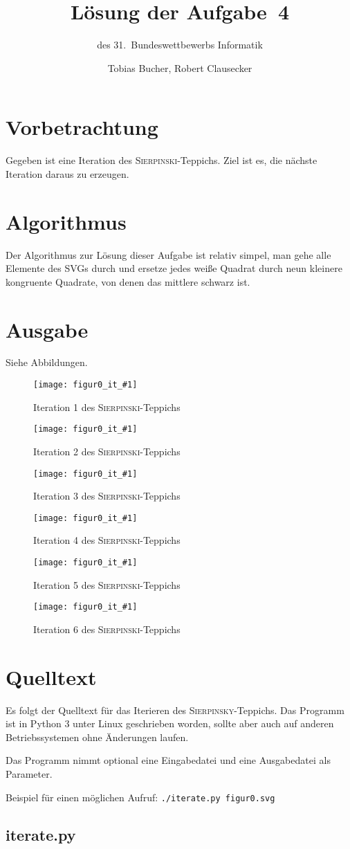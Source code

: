 \documentclass{scrartcl}
\title{Lösung der Aufgabe~4}
\subtitle{des 31.~Bundeswettbewerbs Informatik}
\author{Tobias Bucher, Robert Clausecker}
\newcommand{\src}[1]{\texttt{#1}}
\begin{document}
\maketitle

\section{Vorbetrachtung}
Gegeben ist eine Iteration des \textsc{Sierpinski}-Teppichs. Ziel ist es, die
nächste Iteration daraus zu erzeugen.

\section{Algorithmus}
Der Algorithmus zur Lösung dieser Aufgabe ist relativ simpel, man gehe alle
Elemente des SVGs durch und ersetze jedes weiße Quadrat durch neun kleinere
kongruente Quadrate, von denen das mittlere schwarz ist.

\section{Ausgabe}
Siehe Abbildungen.

\newcommand{\SierpinskyIteration}[1]{%
\begin{figure} %
	\center\texttt{[image: figur0\_it\_\#1]} %
	\caption{Iteration #1 des \textsc{Sierpinski}-Teppichs} %
\end{figure}
}

\SierpinskyIteration{1}
\SierpinskyIteration{2}
\SierpinskyIteration{3}
\SierpinskyIteration{4}
\SierpinskyIteration{5}
\SierpinskyIteration{6}

\newpage\appendix
\section{Quelltext}
Es folgt der Quelltext für das Iterieren des \textsc{Sierpinsky}-Teppichs. Das
Programm ist in Python 3 unter Linux geschrieben worden, sollte aber auch auf
anderen Betriebssystemen ohne Änderungen laufen.

Das Programm nimmt optional eine Eingabedatei und eine Ausgabedatei als
Parameter.

Beispiel für einen möglichen Aufruf: \src{./iterate.py figur0.svg}

\newcommand{\InputSource}[1]{\subsection*{#1.py}}

\InputSource{iterate}
\end{document}

